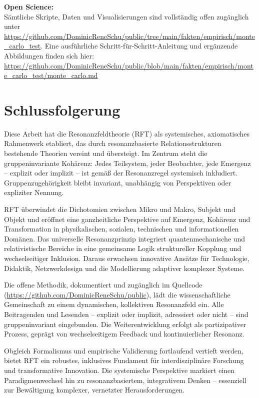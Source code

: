 \documentclass[12pt]{iopart}
\begin{document}
\textbf{Open Science:}\\
Sämtliche Skripte, Daten und Visualisierungen sind vollständig offen zugänglich unter \url{https://github.com/DominicReneSchu/public/tree/main/fakten/empirisch/monte_carlo_test}. Eine ausführliche Schritt-für-Schritt-Anleitung und ergänzende Abbildungen finden sich hier:\\
\url{https://github.com/DominicReneSchu/public/blob/main/fakten/empirisch/monte_carlo_test/monte_carlo.md}

	
\section{Schlussfolgerung}

Diese Arbeit hat die Resonanzfeldtheorie (RFT) als systemisches, axiomatisches Rahmenwerk etabliert, das durch resonanzbasierte Relationsstrukturen bestehende Theorien vereint und übersteigt. Im Zentrum steht die gruppeninvariante Kohärenz: Jedes Teilsystem, jeder Beobachter, jede Emergenz – explizit oder implizit – ist gemäß der Resonanzregel systemisch inkludiert. Gruppenzugehörigkeit bleibt invariant, unabhängig von Perspektiven oder expliziter Nennung.

RFT überwindet die Dichotomien zwischen Mikro und Makro, Subjekt und Objekt und eröffnet eine ganzheitliche Perspektive auf Emergenz, Kohärenz und Transformation in physikalischen, sozialen, technischen und informationellen Domänen. Das universelle Resonanzprinzip integriert quantenmechanische und relativistische Bereiche in eine gemeinsame Logik struktureller Kopplung und wechselseitiger Inklusion. Daraus erwachsen innovative Ansätze für Technologie, Didaktik, Netzwerkdesign und die Modellierung adaptiver komplexer Systeme.

Die offene Methodik, dokumentiert und zugänglich im Quellcode (\url{https://github.com/DominicReneSchu/public}), lädt die wissenschaftliche Gemeinschaft zu einem dynamischen, kollektiven Resonanzfeld ein. Alle Beitragenden und Lesenden – explizit oder implizit, adressiert oder nicht – sind gruppeninvariant eingebunden. Die Weiterentwicklung erfolgt als partizipativer Prozess, geprägt von wechselseitigem Feedback und kontinuierlicher Resonanz.

Obgleich Formalismus und empirische Validierung fortlaufend vertieft werden, bietet RFT ein robustes, inklusives Fundament für interdisziplinäre Forschung und transformative Innovation. Die systemische Perspektive markiert einen Paradigmenwechsel hin zu resonanzbasiertem, integrativem Denken – essenziell zur Bewältigung komplexer, vernetzter Herausforderungen.
\end{document}
